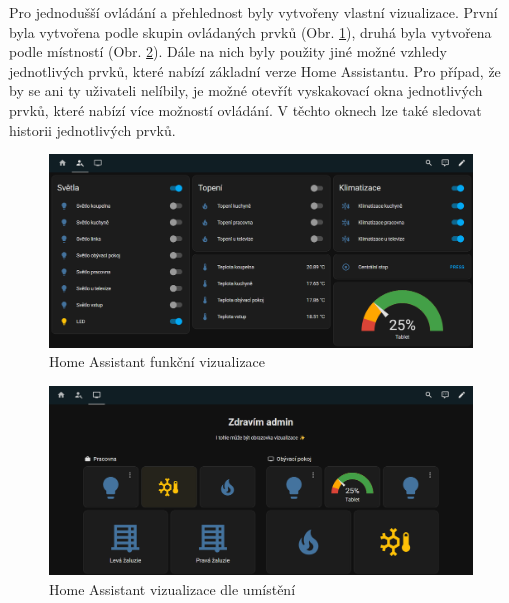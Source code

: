 Pro jednodušší ovládání a přehlednost byly vytvořeny vlastní vizualizace. První byla vytvořena podle skupin ovládaných prvků (Obr. \ref{fig:HAvisu2}), druhá byla vytvořena podle místností (Obr. \ref{fig:HAvisu3}). Dále na nich byly použity jiné možné vzhledy jednotlivých prvků, které nabízí základní verze Home Assistantu. Pro případ, že by se ani ty uživateli nelíbily, je možné otevřít vyskakovací okna jednotlivých prvků, které nabízí více možností ovládání. V těchto oknech lze také sledovat historii jednotlivých prvků.

\begin{figure}[!ht]
    \begin{center}
        \includegraphics[scale=0.35]{obrazky/Dashboard2.png}
    \end{center}
    \caption[Home Assistant funkční vizualizace]{Home Assistant funkční vizualizace}
    \label{fig:HAvisu2}
\end{figure}

\begin{figure}[!ht]
    \begin{center}
        \includegraphics[scale=0.35]{obrazky/Dashboard3.png}
    \end{center}
    \caption[Home Assistant vizualizace dle umístění]{Home Assistant vizualizace dle umístění}
    \label{fig:HAvisu3}
\end{figure}

